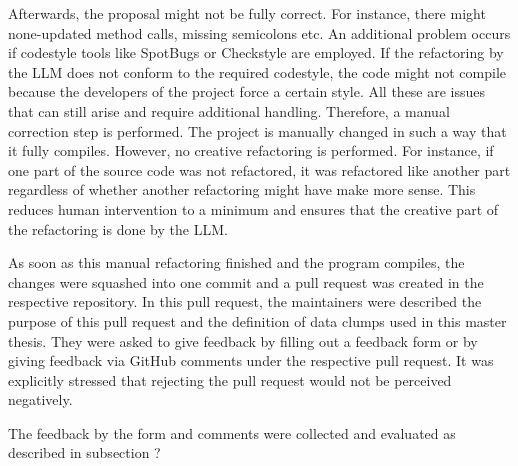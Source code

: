 Afterwards, the proposal might not be fully correct. For instance, there might none-updated method calls, missing semicolons etc. An additional problem occurs if codestyle tools like SpotBugs or Checkstyle are employed. If the refactoring by the \ac{LLM} does not conform to the required codestyle, the code might not compile because the developers of the project force a certain style. All these are issues that can still arise and require additional handling. Therefore, a manual correction step is performed. The project is  manually changed in such a way that it fully compiles. However, no creative refactoring is performed. For instance, if one part of the source code was not refactored, it was refactored like another part regardless of whether another refactoring might have make more sense. This reduces human intervention to a minimum and ensures that the creative part of the refactoring is done by the \ac{LLM}. 

As soon as this manual refactoring finished and the program compiles, the changes were squashed into one commit and a pull request was created in the respective repository. In this pull request, the maintainers were described the purpose of this pull request and  the definition of data clumps used in this master thesis. They were asked to give feedback by filling out a feedback form or by giving feedback via GitHub comments under the respective pull request. It was explicitly stressed that rejecting the pull request would not be perceived negatively. 

The feedback by the form and comments were collected and evaluated as described in subsection ?
